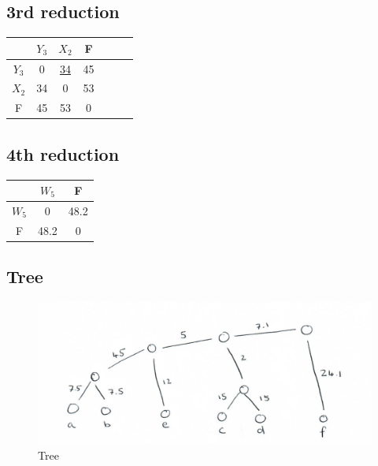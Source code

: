 \documentclass{article}
\begin{document}
\subsection*{3rd reduction}

\begin{center}
\begin{tabular}{c|c c c c c c}
    
    & $Y_3$ &$X_2$&F \\
    \hline
    $Y_3$&0&\underline{34}&45 \\
    $X_2$&34&0&53 \\
    F&45&53&0 \\
   
    
\end{tabular}
\end{center}

\subsection*{4th reduction}

\begin{center}
\begin{tabular}{c|c c}
    
    & $W_5$ &F \\
    \hline
    $W_5$&0&48.2 \\
    F&48.2&0 \\
   
    
\end{tabular}
\end{center}
\subsection*{Tree}
\begin{figure}
    \includegraphics[width=\linewidth]{Tree.png}
    \caption{Tree}
    \label{fig:boat1}
  \end{figure}
  
\end{document}
